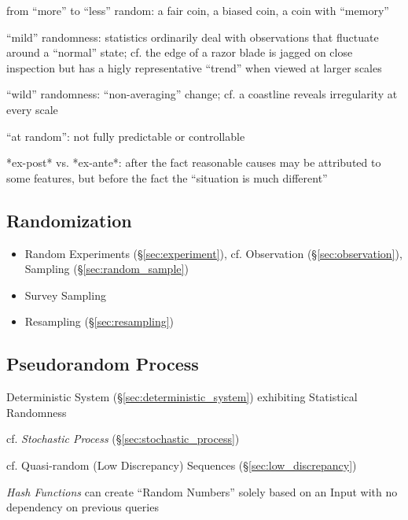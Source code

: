 from ``more'' to ``less'' random: a fair coin, a biased coin, a coin with
``memory''

``mild'' randomness: statistics ordinarily deal with observations that fluctuate
around a ``normal'' state; cf. the edge of a razor blade is jagged on close
inspection but has a higly representative ``trend'' when viewed at larger scales

``wild'' randomness: ``non-averaging'' change; cf. a coastline reveals
irregularity at every scale

``at random'': not fully predictable or controllable

*ex-post* vs. *ex-ante*: after the fact reasonable causes may be attributed to
some features, but before the fact the ``situation is much different''



\subsection{Randomization}\label{sec:randomization}

\begin{itemize}
  \item Random Experiments (\S\ref{sec:experiment}), cf. Observation
    (\S\ref{sec:observation}), Sampling (\S\ref{sec:random_sample})
  \item Survey Sampling
  \item Resampling (\S\ref{sec:resampling})
\end{itemize}



\subsection{Pseudorandom Process}\label{sec:pseudorandom_process}

Deterministic System (\S\ref{sec:deterministic_system}) exhibiting Statistical
Randomness

cf. \emph{Stochastic Process} (\S\ref{sec:stochastic_process})

cf. Quasi-random (Low Discrepancy) Sequences (\S\ref{sec:low_discrepancy})

\emph{Hash Functions} can create ``Random Numbers'' solely based on an Input
with no dependency on previous queries

